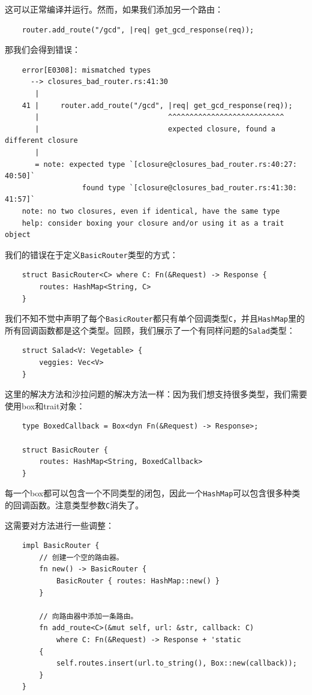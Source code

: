 这可以正常编译并运行。然而，如果我们添加另一个路由：
\begin{verbatim}
    router.add_route("/gcd", |req| get_gcd_response(req));
\end{verbatim}

那我们会得到错误：
\begin{verbatim}
    error[E0308]: mismatched types
      --> closures_bad_router.rs:41:30
       |
    41 |     router.add_route("/gcd", |req| get_gcd_response(req));
       |                              ^^^^^^^^^^^^^^^^^^^^^^^^^^^
       |                              expected closure, found a different closure
       |
       = note: expected type `[closure@closures_bad_router.rs:40:27: 40:50]`
                  found type `[closure@closures_bad_router.rs:41:30: 41:57]`
    note: no two closures, even if identical, have the same type
    help: consider boxing your closure and/or using it as a trait object
\end{verbatim}

我们的错误在于定义\texttt{BasicRouter}类型的方式：
\begin{verbatim}
    struct BasicRouter<C> where C: Fn(&Request) -> Response {
        routes: HashMap<String, C>
    }
\end{verbatim}

我们不知不觉中声明了每个\texttt{BasicRouter}都只有单个回调类型\texttt{C}，并且\texttt{HashMap}里的所有回调函数都是这个类型。回顾，我们展示了一个有同样问题的\texttt{Salad}类型：
\begin{verbatim}
    struct Salad<V: Vegetable> {
        veggies: Vec<V>
    }
\end{verbatim}
这里的解决方法和沙拉问题的解决方法一样：因为我们想支持很多类型，我们需要使用box和trait对象：
\begin{verbatim}
    type BoxedCallback = Box<dyn Fn(&Request) -> Response>;

    struct BasicRouter {
        routes: HashMap<String, BoxedCallback>
    }
\end{verbatim}

每一个box都可以包含一个不同类型的闭包，因此一个\texttt{HashMap}可以包含很多种类的回调函数。注意类型参数\texttt{C}消失了。

这需要对方法进行一些调整：
\begin{verbatim}
    impl BasicRouter {
        // 创建一个空的路由器。
        fn new() -> BasicRouter {
            BasicRouter { routes: HashMap::new() }
        }

        // 向路由器中添加一条路由。
        fn add_route<C>(&mut self, url: &str, callback: C)
            where C: Fn(&Request) -> Response + 'static
        {
            self.routes.insert(url.to_string(), Box::new(callback));
        }
    }
\end{verbatim}


